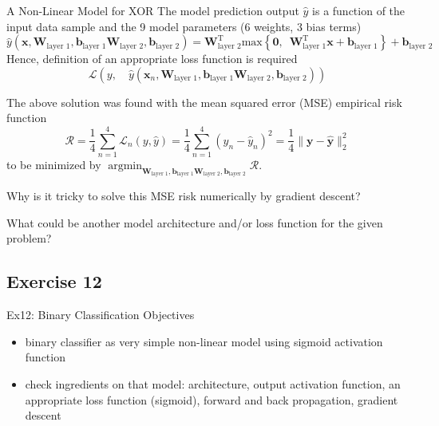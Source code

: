 \documentclass[mathserif, aspectratio=1610]{intbeamer}
\begin{document}
\begin{frame}[t]{A Non-Linear Model for XOR}
The model prediction output $\hat{y}$ is a function of the input data sample and the 9 model parameters (6 weights, 3 bias terms)
$$
\hat{y}\left(\bm{x},\bm{W}_\text{layer 1}, \bm{b}_\text{layer 1}
\bm{W}_\text{layer 2}, \bm{b}_\text{layer 2}\right)
=
\bm{W}_\text{layer 2}^\mathrm{T}
\mathrm{max}\left\{\bm{0},\,\,\,\bm{W}_\text{layer 1}^\mathrm{T} \bm{x} + \bm{b}_\text{layer 1}\right\}
+ \bm{b}_\text{layer 2}
$$
Hence, definition of an appropriate loss function is required
$$
\mathcal{L}\left(y,\quad\hat{y}\left(\bm{x}_n, \bm{W}_\text{layer 1}, \bm{b}_\text{layer 1}
\bm{W}_\text{layer 2}, \bm{b}_\text{layer 2}\right)\right)
$$

The above solution was found with the mean squared error (MSE) empirical risk function
$$\mathcal{R} = \frac{1}{4}\sum_{n=1}^4 \mathcal{L}_n(y, \hat{y}) = \frac{1}{4}\sum_{n=1}^4 (y_n-\hat{y}_n)^2 = \frac{1}{4}\lVert\bm{y} - \hat{\bm{y}}\rVert_2^2$$
to be minimized by $\operatorname*{argmin}_{\bm{W}_\text{layer 1}, \bm{b}_\text{layer 1}
\bm{W}_\text{layer 2}, \bm{b}_\text{layer 2}} \mathcal{R}$.

Why is it tricky to solve this MSE risk numerically by gradient descent?

What could be another model architecture and/or loss function for the given problem?



\end{frame}




\subsection{Exercise 12}

\begin{frame}{Ex12: Binary Classification}
Objectives
\begin{itemize}
\item binary classifier as very simple non-linear model using sigmoid activation function
\item check ingredients on that model: architecture, output activation function, an appropriate loss function (sigmoid), forward and back propagation, gradient descent
\end{itemize}
\end{frame}
\end{document}
